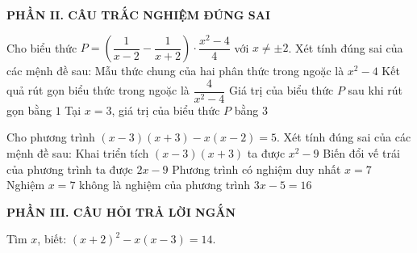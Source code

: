 \documentclass[12pt,a4paper]{article}
\begin{document}
\setcounter{ex}{0}
\noindent\textbf{\large PHẦN II. CÂU TRẮC NGHIỆM ĐÚNG SAI}
\vspace{1mm}
\begin{ex}
Cho biểu thức $P = \left(\dfrac{1}{x - 2} - \dfrac{1}{x + 2}\right) \cdot \dfrac{x^2 - 4}{4}$ với $x \neq \pm 2$. Xét tính đúng sai của các mệnh đề sau:
\choiceTF
{\True Mẫu thức chung của hai phân thức trong ngoặc là $x^2 - 4$}
{\True Kết quả rút gọn biểu thức trong ngoặc là $\dfrac{4}{x^2 - 4}$}
{\True Giá trị của biểu thức $P$ sau khi rút gọn bằng $1$}
{Tại $x = 3$, giá trị của biểu thức $P$ bằng $3$}
\end{ex}

\begin{ex}
Cho phương trình $(x - 3)(x + 3) - x(x - 2) = 5$. Xét tính đúng sai của các mệnh đề sau:
\choiceTF
{\True Khai triển tích $(x - 3)(x + 3)$ ta được $x^2 - 9$}
{\True Biến đổi vế trái của phương trình ta được $2x - 9$}
{\True Phương trình có nghiệm duy nhất $x = 7$}
{Nghiệm $x = 7$ không là nghiệm của phương trình $3x - 5 = 16$}
\end{ex}


\setcounter{ex}{0}
\noindent\textbf{\large PHẦN III. CÂU HỎI TRẢ LỜI NGẮN}
\vspace{1mm}
\begin{ex}
Tìm $x$, biết: $(x + 2)^2 - x(x - 3) = 14$. 
\end{ex}
\end{document}
